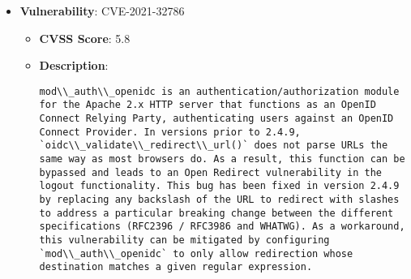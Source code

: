 \documentclass{article}
\begin{document}
\begin{itemize}
    
        \item \textbf{Vulnerability}: CVE-2021-32786
        \begin{itemize}
            \item \textbf{CVSS Score}:  5.8 
            \item \textbf{Description}:
            \parbox[t]{0.9\linewidth}{
                \verb|mod\\_auth\\_openidc is an authentication/authorization module for the Apache 2.x HTTP server that functions as an OpenID Connect Relying Party, authenticating users against an OpenID Connect Provider. In versions prior to 2.4.9, `oidc\\_validate\\_redirect\\_url()` does not parse URLs the same way as most browsers do. As a result, this function can be bypassed and leads to an Open Redirect vulnerability in the logout functionality. This bug has been fixed in version 2.4.9 by replacing any backslash of the URL to redirect with slashes to address a particular breaking change between the different specifications (RFC2396 / RFC3986 and WHATWG). As a workaround, this vulnerability can be mitigated by configuring `mod\\_auth\\_openidc` to only allow redirection whose destination matches a given regular expression.|
            }
        \end{itemize}
    

\end{itemize}
\end{document}
